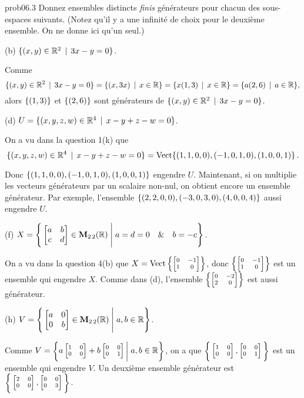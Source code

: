 \bigskip
\begin{sol}{prob06.3}  Donnez  ensembles distincts {\it finis} g\'en\'erateurs pour chacun des sous-espaces suivants. (Notez qu'il y a une  infinit\'e de choix pour le deuxi\`eme ensemble. On ne donne ici qu'un seul.)
\medskip



(b)  $\{(x, y) \in \mathbb{R}^2\, \mid \, 3x - y=0 \}$.

\soln Comme $$\{(x, y) \in \mathbb{R}^2\, \mid \, 3x - y=0 \}=\{(x, 3x)\, \mid \, x\in \mathbb{R}\}=\{x(1,3)\, \mid \, x\in \mathbb{R}\}=\{a(2,6)\, \mid \, a\in \mathbb{R}\},$$ alors $\{(1,3)\}$ et $\{(2,6)\}$ sont g\'en\'erateurs de $\{(x, y) \in \mathbb{R}^2\, \mid \, 3x - y=0 \}$.

\medskip
(d)  $U=\{(x, y, z, w) \in \mathbb{R}^4\, \mid \, x-y+z-w=0 \}$.

\soln On a vu dans la question 1(k) que $$\{(x, y, z, w) \in \mathbb{R}^4\, \mid \, x-y+z-w=0 \}=\operatorname{ Vect} \normalsize\{(1,1,0,0),(-1, 0,1,0),(1,0,0,1) \normalsize\}\,.$$

Donc $\{(1,1,0,0),(-1, 0,1,0),(1,0,0,1) \}$ engendre $U$. Maintenant, si on multiplie les vecteurs g\'en\'erateurs par un scalaire non-nul, on obtient encore un ensemble g\'en\'erateur. Par exemple, l'ensemble $\{(2,2,0,0),(-3, 0,3,0),(4,0,0,4) \}$ aussi engendre $U$.

  \medskip

(f)  $X=\Bigg\{  \bmatrix a&b\\ c&d\endbmatrix \in \M_{2 \,2}(\R) \;\Bigg|\;a=d=0\quad \&\quad b=-c  \Bigg\}$.
  
\soln On a vu dans la question 4(b) que $X=\text{Vect}\left\{ \scriptsize\bmatrix 0&-1\\ 1&0\endbmatrix\right\}$, donc $\left\{ \scriptsize\bmatrix 0&-1\\ 1&0\endbmatrix\right\}$ est un ensemble qui engendre $X$. Comme dans (d), l'ensemble $\left\{ \scriptsize\bmatrix 0&-2\\ 2&0\endbmatrix\right\}$ est aussi générateur. \medskip


(h)  $V=\Bigg\{  \bmatrix a&0\\ 0&b\endbmatrix \in \M_{2 \,2}(\R) \;\Bigg|\;  a, b \in \R\Bigg\}$. 

\soln Comme $V=\scriptsize\Bigg\{a\bmatrix 1&0\\ 0&0\endbmatrix+ b\bmatrix 0&0\\ 0&1\endbmatrix \Bigg|\;  a, b \in \R\Bigg\}$, on a que $\scriptsize\Bigg\{\bmatrix 1&0\\ 0&0\endbmatrix, \bmatrix 0&0\\ 0&1\endbmatrix \Bigg\}$ est un ensemble qui engendre $V$. Un deuxi\`eme ensemble générateur est $\scriptsize\Bigg\{\bmatrix 2&0\\ 0&0\endbmatrix, \bmatrix 0&0\\ 0&3\endbmatrix \Bigg\}$.


\end{sol}

